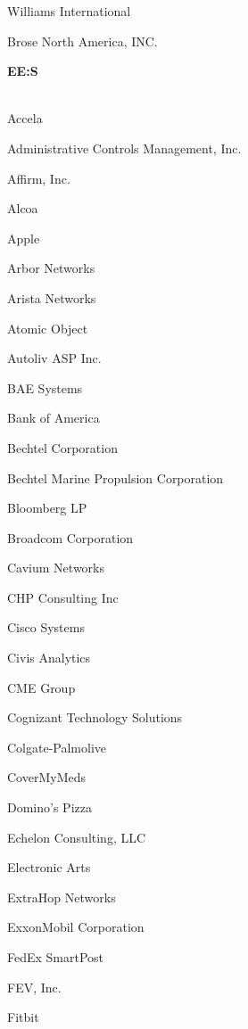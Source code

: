 \documentclass[twoside]{article}
\begin{document}
\begin{center}
\begin{multicols}{5}
\begin{FlushLeft}
\begin{compactitem}
\item Williams International
\item Brose North America, INC.
\end{compactitem}
        \end{FlushLeft}
        \vspace{1em}
        {\fontsize{14}{16}\selectfont \bf EE:S}\\
        \vspace{-1em}
        ~\hrulefill~
        \vspace{-.9em}
        \begin{FlushLeft}
        \begin{compactitem}
        \item Accela
\item Administrative Controls Management, Inc.
\item Affirm, Inc.
\item Alcoa
\item Apple
\item Arbor Networks
\item Arista Networks
\item Atomic Object
\item Autoliv ASP Inc.
\item BAE Systems
\item Bank of America
\item Bechtel Corporation
\item Bechtel Marine Propulsion Corporation
\item Bloomberg LP
\item Broadcom Corporation
\item Cavium Networks
\item CHP Consulting Inc
\item Cisco Systems
\item Civis Analytics
\item CME Group
\item Cognizant Technology Solutions
\item Colgate-Palmolive
\item CoverMyMeds
\item Domino's Pizza
\item Echelon Consulting, LLC
\item Electronic Arts
\item ExtraHop Networks
\item ExxonMobil Corporation
\item FedEx SmartPost
\item FEV, Inc.
\item Fitbit

\end{compactitem}
\end{FlushLeft}
\end{multicols}
\end{center}
\end{document}
